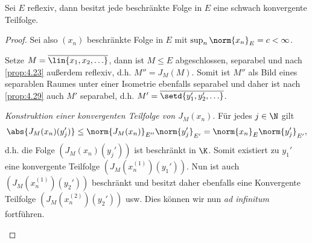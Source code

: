 \begin{prop}
\label{prop:4.30}
Sei $E$ reflexiv, dann besitzt jede beschränkte Folge in $E$ eine schwach
konvergente Teilfolge.\fishhere
\end{prop}
\begin{proof}
Sei also $(x_n)$ beschränkte Folge in $E$ mit $\sup_n \norm{x_n}_E = c <
\infty$.
\begin{proofenum}
\item Setze $M=\overline{\lin{x_1,x_2,\ldots}}$, dann ist $M\le E$
abgeschlossen, separabel und nach \ref{prop:4.23} außerdem reflexiv, d.h.
$M''=J_M(M)$. Somit ist $M''$ als Bild eines separablen Raumes unter einer
Isometrie ebenfalls separabel und daher ist nach \ref{prop:4.29} auch $M'$
separabel, d.h. $M'=\overline{\setd{y_1',y_2',\ldots}}$.
\item \textit{Konstruktion einer konvergenten Teilfolge von $J_M(x_n)$}. Für
jedes $j\in\N$ gilt
\begin{align*}
\abs{J_M(x_n)(y_j')} \le \norm{J_M(x_n)}_{E''}\norm{y_j'}_{E'} =
\norm{x_n}_{E}\norm{y_j'}_{E'},
\end{align*} 
d.h. die Folge $\left(J_M(x_n)(y_j')\right)$ ist beschränkt in $\K$. Somit
existiert zu $y_1'$ eine konvergente Teilfolge $(J_M(x_n^{(1)})(y_1'))$. Nun ist auch
$(J_M(x_n^{(1)})(y_2'))$ beschränkt und besitzt daher ebenfalls eine Konvergente
Teilfolge $(J_M(x_n^{(2)})(y_2'))$ usw.
Dies können wir nun \textit{ad
infinitum} fortführen.


\end{proofenum}
\end{proof}
